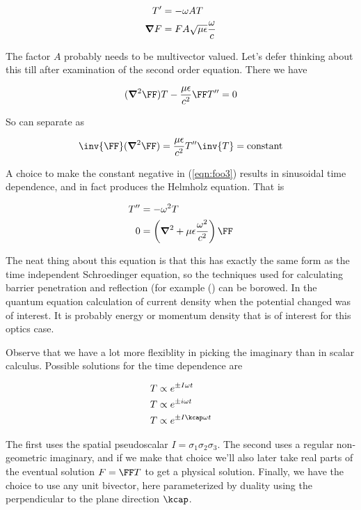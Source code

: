 \begin{align}\label{eqn:foo5}
T' &= -\omega A T \\
\boldsymbol{\nabla} F &= F A \sqrt{\mu\epsilon} \frac{\omega}{c}
\end{align}

The factor $A$ probably needs to be multivector valued.  Let's defer thinking about this till after examination of the second order equation.  There we have

\begin{align*}
(\spacegrad^2 \FF) T - \frac{\mu\epsilon}{c^2} \FF T'' = 0
\end{align*}

So can separate as 

\begin{align}\label{eqn:foo3}
\inv{\FF} (\spacegrad^2 \FF) = \frac{\mu\epsilon}{c^2} T'' \inv{T} = \text{constant}
\end{align}

A choice to make the constant negative in (\ref{eqn:foo3}) results in sinusoidal time dependence, and in fact produces the Helmholz equation.  That is

\begin{align}\label{eqn:foo4}
T'' &= - \omega^2 T \\
  0 &= \left(\spacegrad^2 + \mu\epsilon \frac{\omega^2}{c^2} \right) \FF 
\end{align}

The neat thing about this equation is that this has exactly the same form as the time independent Schroedinger equation, so the techniques used for calculating barrier penetration and reflection (for example (\cite{bohm1989qt}) can be borowed.  In the quantum equation calculation of current density when the potential changed was of interest.  It is probably energy or momentum density that is of interest for this optics case.

Observe that we have a lot more flexiblity in picking the imaginary than in scalar calculus.  Possible solutions for the time dependence are

\begin{align*}
T &\propto e^{\pm I\omega t} \\
T &\propto e^{\pm i\omega t} \\
T &\propto e^{\pm I \kcap \omega t}
\end{align*}

The first uses the spatial pseudoscalar $I = \sigma_1 \sigma_2 \sigma_3$.  The second uses a regular non-geometric imaginary, and if we make that choice we'll also later take real parts of the eventual solution $F = \FF T$ to get a physical solution.  Finally, we have the choice to use any unit bivector, here parameterized by duality using the perpendicular to the plane direction $\kcap$.

\EndArticle
